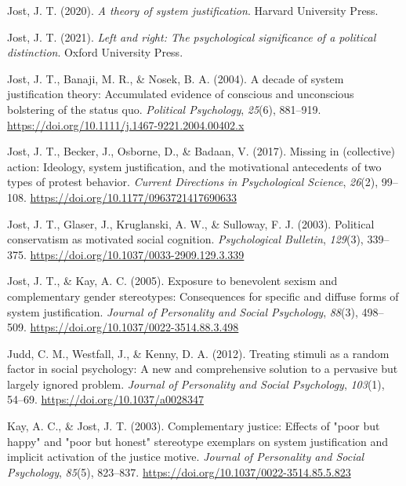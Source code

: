 \documentclass[12pt, letterpaper]{article}
\newenvironment{CSLReferences}[2]{}{}
\begin{document}
\begin{CSLReferences}{1}{0}
\leavevmode{}%
Jost, J. T. (2020). \emph{A theory of system justification}. Harvard
University Press.

\leavevmode{}%
Jost, J. T. (2021). \emph{Left and right: The psychological significance
of a political distinction}. Oxford University Press.

\leavevmode{}%
Jost, J. T., Banaji, M. R., \& Nosek, B. A. (2004). A decade of system
justification theory: Accumulated evidence of conscious and unconscious
bolstering of the status quo. \emph{Political Psychology}, \emph{25}(6),
881--919. \url{https://doi.org/10.1111/j.1467-9221.2004.00402.x}

\leavevmode{}%
Jost, J. T., Becker, J., Osborne, D., \& Badaan, V. (2017). Missing in
(collective) action: Ideology, system justification, and the
motivational antecedents of two types of protest behavior. \emph{Current
Directions in Psychological Science}, \emph{26}(2), 99--108.
\url{https://doi.org/10.1177/0963721417690633}

\leavevmode{}%
Jost, J. T., Glaser, J., Kruglanski, A. W., \& Sulloway, F. J. (2003).
Political conservatism as motivated social cognition.
\emph{Psychological Bulletin}, \emph{129}(3), 339--375.
\url{https://doi.org/10.1037/0033-2909.129.3.339}

\leavevmode{}%
Jost, J. T., \& Kay, A. C. (2005). Exposure to benevolent sexism and
complementary gender stereotypes: Consequences for specific and diffuse
forms of system justification. \emph{Journal of Personality and Social
Psychology}, \emph{88}(3), 498--509.
\url{https://doi.org/10.1037/0022-3514.88.3.498}

\leavevmode{}%
Judd, C. M., Westfall, J., \& Kenny, D. A. (2012). Treating stimuli as a
random factor in social psychology: {A} new and comprehensive solution
to a pervasive but largely ignored problem. \emph{Journal of Personality
and Social Psychology}, \emph{103}(1), 54--69.
\url{https://doi.org/10.1037/a0028347}

\leavevmode{}%
Kay, A. C., \& Jost, J. T. (2003). Complementary justice: Effects of
"poor but happy" and "poor but honest" stereotype exemplars on system
justification and implicit activation of the justice motive.
\emph{Journal of Personality and Social Psychology}, \emph{85}(5),
823--837. \url{https://doi.org/10.1037/0022-3514.85.5.823}


\end{CSLReferences}
\end{document}
